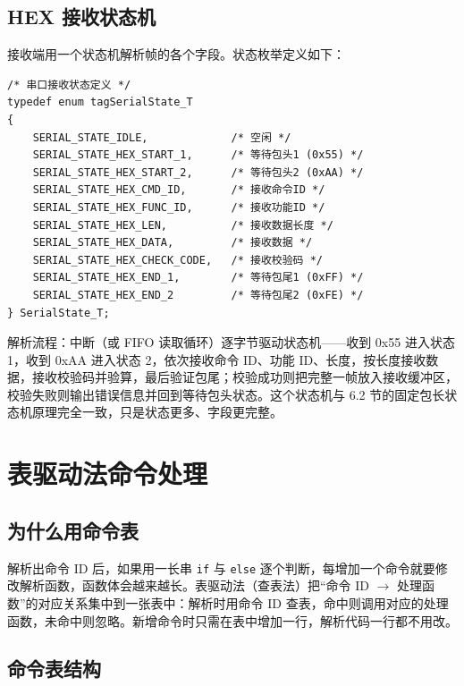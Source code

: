 \subsection{HEX 接收状态机}

接收端用一个状态机解析帧的各个字段。状态枚举定义如下：

\begin{lstlisting}[style=c]
/* 串口接收状态定义 */
typedef enum tagSerialState_T
{
    SERIAL_STATE_IDLE,             /* 空闲 */
    SERIAL_STATE_HEX_START_1,      /* 等待包头1 (0x55) */
    SERIAL_STATE_HEX_START_2,      /* 等待包头2 (0xAA) */
    SERIAL_STATE_HEX_CMD_ID,       /* 接收命令ID */
    SERIAL_STATE_HEX_FUNC_ID,      /* 接收功能ID */
    SERIAL_STATE_HEX_LEN,          /* 接收数据长度 */
    SERIAL_STATE_HEX_DATA,         /* 接收数据 */
    SERIAL_STATE_HEX_CHECK_CODE,   /* 接收校验码 */
    SERIAL_STATE_HEX_END_1,        /* 等待包尾1 (0xFF) */
    SERIAL_STATE_HEX_END_2         /* 等待包尾2 (0xFE) */
} SerialState_T;
\end{lstlisting}

解析流程：中断（或 FIFO 读取循环）逐字节驱动状态机——收到 0x55 进入状态 1，收到 0xAA 进入状态 2，依次接收命令 ID、功能 ID、长度，按长度接收数据，接收校验码并验算，最后验证包尾；校验成功则把完整一帧放入接收缓冲区，校验失败则输出错误信息并回到等待包头状态。这个状态机与 6.2 节的固定包长状态机原理完全一致，只是状态更多、字段更完整。

\section{表驱动法命令处理}

\subsection{为什么用命令表}

解析出命令 ID 后，如果用一长串 \texttt{if} 与 \texttt{else} 逐个判断，每增加一个命令就要修改解析函数，函数体会越来越长。表驱动法（查表法）把“命令 ID $\rightarrow$ 处理函数”的对应关系集中到一张表中：解析时用命令 ID 查表，命中则调用对应的处理函数，未命中则忽略。新增命令时只需在表中增加一行，解析代码一行都不用改。

\subsection{命令表结构}

